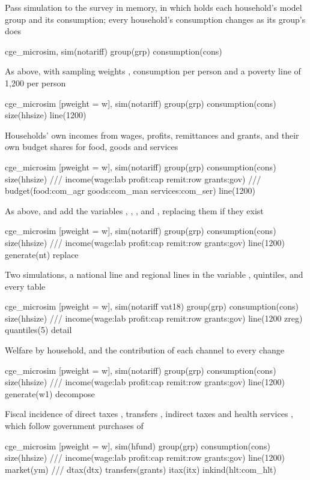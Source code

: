 Pass simulation  to the survey in memory, in which 
holds each household's model group and  its consumption; every
household's consumption changes as its group's does
\begin{stcode}
cge_microsim, sim(notariff) group(grp) consumption(cons)
\end{stcode}
As above, with sampling weights , consumption per person and a poverty
line of 1,200 per person
\begin{stcode}
cge_microsim [pweight = w], sim(notariff) group(grp) consumption(cons) size(hhsize) line(1200)
\end{stcode}
Households' own incomes from wages, profits, remittances and grants, and
their own budget shares for food, goods and services
\begin{stcode}
cge_microsim [pweight = w], sim(notariff) group(grp) consumption(cons) size(hhsize) ///
    income(wage:lab profit:cap remit:row grants:gov)                              ///
    budget(food:com_agr goods:com_man services:com_ser) line(1200)
\end{stcode}
As above, and add the variables , , ,
 and , replacing them if they exist
\begin{stcode}
cge_microsim [pweight = w], sim(notariff) group(grp) consumption(cons) size(hhsize) ///
    income(wage:lab profit:cap remit:row grants:gov) line(1200) generate(nt) replace
\end{stcode}
Two simulations, a national line and regional lines in the variable
, quintiles, and every table
\begin{stcode}
cge_microsim [pweight = w], sim(notariff vat18) group(grp) consumption(cons) size(hhsize) ///
    income(wage:lab profit:cap remit:row grants:gov) line(1200 zreg) quantiles(5) detail
\end{stcode}
Welfare by household, and the contribution of each channel to every change
\begin{stcode}
cge_microsim [pweight = w], sim(notariff) group(grp) consumption(cons) size(hhsize) ///
    income(wage:lab profit:cap remit:row grants:gov) line(1200) generate(w1) decompose
\end{stcode}
Fiscal incidence of direct taxes , transfers , indirect
taxes  and health services , which follow government
purchases of 
\begin{stcode}
cge_microsim [pweight = w], sim(hfund) group(grp) consumption(cons) size(hhsize) ///
    income(wage:lab profit:cap remit:row grants:gov) line(1200) market(ym)        ///
    dtax(dtx) transfers(grants) itax(itx) inkind(hlt:com_hlt)
\end{stcode}
